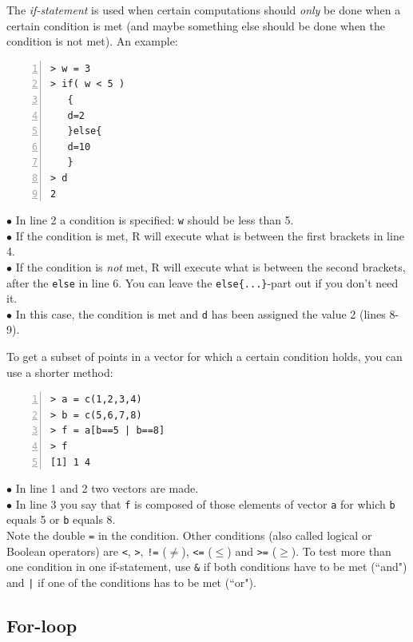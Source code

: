 \documentclass[a4paper,11pt,twocolumn,tablecaptionabove]{scrartcl}
\begin{document}
The \emph{if-statement} is used when certain computations should \emph{only} be done when a certain condition is met (and maybe something else should be done when the condition is not met). An example:

\begin{Verbatim}[frame=single,numbers=left,gobble=0, xleftmargin=0.35cm, numbersep=0.1cm]
> w = 3
> if( w < 5 )
   {
   d=2
   }else{
   d=10
   }
> d
2
\end{Verbatim}

\noindent $\bullet$ In line 2 a condition is specified: \texttt{w} should be less than 5.\\
\noindent $\bullet$ If the condition is met, R will execute what is between the first brackets in line 4.\\
\noindent $\bullet$ If the condition is \emph{not} met, R will execute what is between the second brackets, after the \texttt{else} in line 6. You can leave the \verb!else{...}!-part out if you don't need it.\\
\noindent $\bullet$ In this case, the condition is met and \texttt{d} has been assigned the value 2 (lines 8-9).

To get a subset of points in a vector for which a certain condition holds, you can use a shorter method:

\begin{Verbatim}[frame=single,numbers=left,gobble=0, xleftmargin=0.35cm, numbersep=0.1cm]
> a = c(1,2,3,4)
> b = c(5,6,7,8)
> f = a[b==5 | b==8]
> f
[1] 1 4
\end{Verbatim}

\noindent $\bullet$ In line 1 and 2 two vectors are made.\\
\noindent $\bullet$ In line 3 you say that \texttt{f} is composed of those elements of vector \texttt{a} for which \texttt{b} equals 5 or \texttt{b} equals 8. \\

Note the double \texttt{=} in the condition. Other conditions (also called logical or Boolean operators) are \texttt{<}, \texttt{>}, \texttt{!=} ($\neq$), \texttt{<=} ($\leq$) and \texttt{>=} ($\geq$). To test more than one condition in one if-statement, use \texttt{\&} if both conditions have to be met (``and") and \texttt{|} if one of the conditions has to be met (``or").

\subsection{For-loop}
\end{document}
